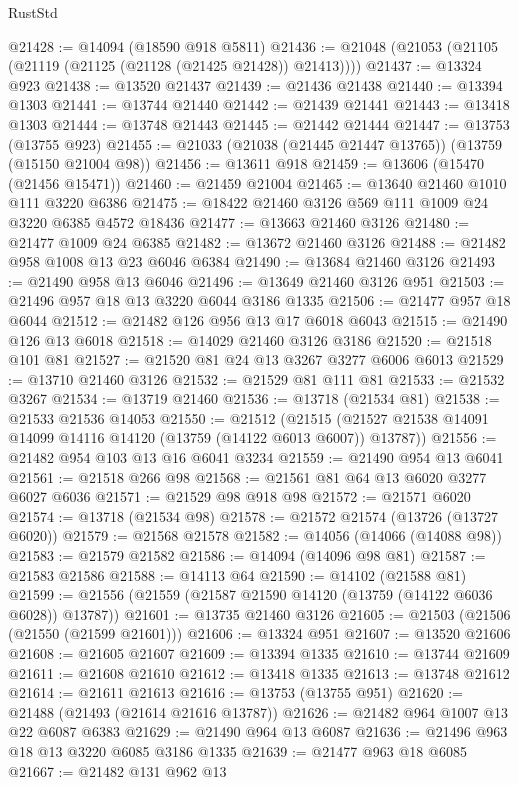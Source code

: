 \begin{lexlean}{RustStd}
\begin{coremodule}
@21428 := @14094 (@18590 @918 @5811)
@21436 := @21048 (@21053 (@21105 (@21119 (@21125 (@21128 (@21425 @21428)) @21413))))
@21437 := @13324 @923
@21438 := @13520 @21437
@21439 := @21436 @21438
@21440 := @13394 @1303
@21441 := @13744 @21440
@21442 := @21439 @21441
@21443 := @13418 @1303
@21444 := @13748 @21443
@21445 := @21442 @21444
@21447 := @13753 (@13755 @923)
@21455 := @21033 (@21038 (@21445 @21447 @13765)) (@13759 (@15150 @21004 @98))
@21456 := @13611 @918
@21459 := @13606 (@15470 (@21456 @15471))
@21460 := @21459 @21004
@21465 := @13640 @21460 @1010 @111 @3220 @6386
@21475 := @18422 @21460 @3126 @569 @111 @1009 @24 @3220 @6385 @4572 @18436
@21477 := @13663 @21460 @3126
@21480 := @21477 @1009 @24 @6385
@21482 := @13672 @21460 @3126
@21488 := @21482 @958 @1008 @13 @23 @6046 @6384
@21490 := @13684 @21460 @3126
@21493 := @21490 @958 @13 @6046
@21496 := @13649 @21460 @3126 @951
@21503 := @21496 @957 @18 @13 @3220 @6044 @3186 @1335
@21506 := @21477 @957 @18 @6044
@21512 := @21482 @126 @956 @13 @17 @6018 @6043
@21515 := @21490 @126 @13 @6018
@21518 := @14029 @21460 @3126 @3186
@21520 := @21518 @101 @81
@21527 := @21520 @81 @24 @13 @3267 @3277 @6006 @6013
@21529 := @13710 @21460 @3126
@21532 := @21529 @81 @111 @81
@21533 := @21532 @3267
@21534 := @13719 @21460
@21536 := @13718 (@21534 @81)
@21538 := @21533 @21536 @14053
@21550 := @21512
    (@21515 (@21527 @21538 @14091 @14099 @14116 @14120 (@13759 (@14122 @6013 @6007)) @13787))
@21556 := @21482 @954 @103 @13 @16 @6041 @3234
@21559 := @21490 @954 @13 @6041
@21561 := @21518 @266 @98
@21568 := @21561 @81 @64 @13 @6020 @3277 @6027 @6036
@21571 := @21529 @98 @918 @98
@21572 := @21571 @6020
@21574 := @13718 (@21534 @98)
@21578 := @21572 @21574 (@13726 (@13727 @6020))
@21579 := @21568 @21578
@21582 := @14056 (@14066 (@14088 @98))
@21583 := @21579 @21582
@21586 := @14094 (@14096 @98 @81)
@21587 := @21583 @21586
@21588 := @14113 @64
@21590 := @14102 (@21588 @81)
@21599 := @21556 (@21559 (@21587 @21590 @14120 (@13759 (@14122 @6036 @6028)) @13787))
@21601 := @13735 @21460 @3126
@21605 := @21503 (@21506 (@21550 (@21599 @21601)))
@21606 := @13324 @951
@21607 := @13520 @21606
@21608 := @21605 @21607
@21609 := @13394 @1335
@21610 := @13744 @21609
@21611 := @21608 @21610
@21612 := @13418 @1335
@21613 := @13748 @21612
@21614 := @21611 @21613
@21616 := @13753 (@13755 @951)
@21620 := @21488 (@21493 (@21614 @21616 @13787))
@21626 := @21482 @964 @1007 @13 @22 @6087 @6383
@21629 := @21490 @964 @13 @6087
@21636 := @21496 @963 @18 @13 @3220 @6085 @3186 @1335
@21639 := @21477 @963 @18 @6085
@21667 := @21482
    @131
    @962
    @13

\end{coremodule}
\end{lexlean}
